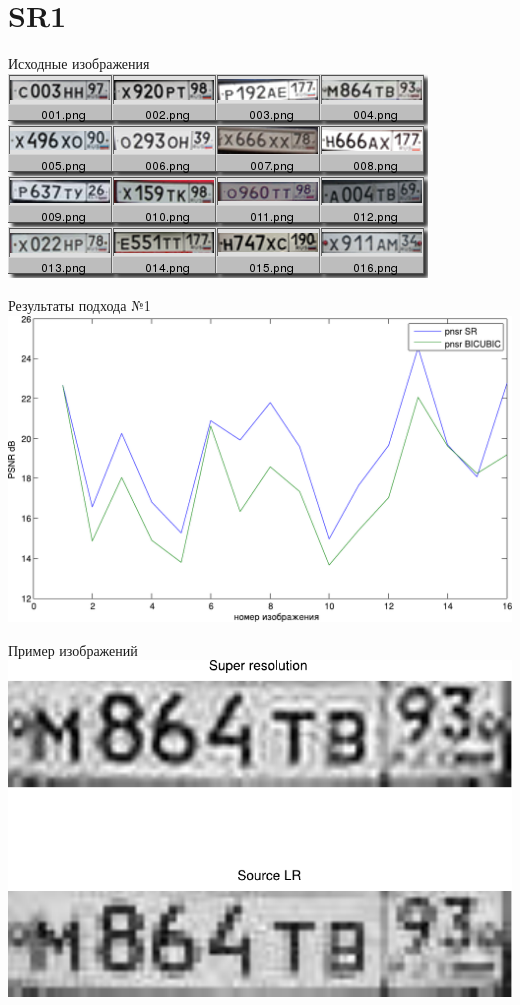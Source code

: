 \section{SR1}
\begin{frame}{Исходные изображения}
  \includegraphics[width=\columnwidth]{content/out_sr1.png}
\end{frame}
\begin{frame}{Результаты подхода №1}
  \includegraphics[width=\columnwidth]{content/pnsr_for_big_jpeg.pdf}
\end{frame}
\begin{frame}{Пример изображений}
  \includegraphics[width=\columnwidth]{content/compare_result_sr1.pdf}
\end{frame}

